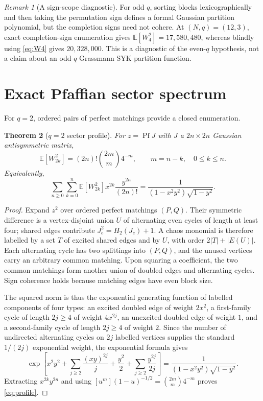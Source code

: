 \documentclass[11pt,a4paper]{article}
\newtheorem{theorem}{Theorem}[section]
\theoremstyle{definition}
\theoremstyle{remark}
\newtheorem{remark}[theorem]{Remark}
\newcommand{\E}{\mathbb{E}}
\begin{document}
\begin{remark}[A sign-scope diagnostic]
For odd $q$, sorting blocks lexicographically and then taking the permutation sign defines
a formal Gaussian partition polynomial, but the completion signs need not cohere.
At $(N,q)=(12,3)$, exact completion-sign enumeration gives
$\E[W_4^2]=17{,}580{,}480$, whereas blindly using \eqref{eq:W4} gives $20{,}328{,}000$.
This is a diagnostic of the even-$q$ hypothesis, not a claim about an odd-$q$
Grassmann SYK partition function.
\end{remark}

\section{Exact Pfaffian sector spectrum}

For $q=2$, ordered pairs of perfect matchings provide a closed enumeration.

\begin{theorem}[$q=2$ sector profile]\label{thm:profile}
For $z=\operatorname{Pf}J$ with $J$ a $2n\times2n$ Gaussian antisymmetric matrix,
\begin{equation}
 \boxed{\quad\E[W_{2k}^2]=(2n)!\binom{2m}{m}4^{-m},\qquad m=n-k,\quad0\le k\le n.\quad}
 \label{eq:profile}
\end{equation}
Equivalently,
\begin{equation}
 \sum_{n\ge0}\sum_{k=0}^{n}\E[W_{2k}^2]x^{2k}\frac{y^{2n}}{(2n)!}
 =\frac{1}{(1-x^2y^2)\sqrt{1-y^2}}.
 \label{eq:GF}
\end{equation}
\end{theorem}

\begin{proof}
Expand $z^2$ over ordered perfect matchings $(P,Q)$.  Their symmetric difference is a
vertex-disjoint union $U$ of alternating even cycles of length at least four; shared edges
contribute $J_e^2=H_2(J_e)+1$.  A chaos monomial is therefore labelled by a set $T$ of
excited shared edges and by $U$, with order $2|T|+|E(U)|$.  Each alternating cycle has two
splittings into $(P,Q)$, and the unused vertices carry an arbitrary common matching.  Upon
squaring a coefficient, the two common matchings form another union of doubled edges and
alternating cycles.  Sign coherence holds because matching edges have even block size.

The squared norm is thus the exponential generating function of labelled components of four
types: an excited doubled edge of weight $2x^2$, a first-family cycle of length $2j\ge4$
of weight $4x^{2j}$, an unexcited doubled edge of weight $1$, and a second-family cycle of
length $2j\ge4$ of weight $2$.  Since the number of undirected alternating cycles on $2j$
labelled vertices supplies the standard $1/(2j)$ exponential weight, the exponential formula
gives
\[
 \exp\!\left[x^2y^2+\sum_{j\ge2}\frac{(xy)^{2j}}{j}
 +\frac{y^2}{2}+\sum_{j\ge2}\frac{y^{2j}}{2j}\right]
 =\frac{1}{(1-x^2y^2)\sqrt{1-y^2}}.
\]
Extracting $x^{2k}y^{2n}$ and using
$[u^m](1-u)^{-1/2}=\binom{2m}{m}4^{-m}$ proves \eqref{eq:profile}.
\end{proof}
\end{document}
